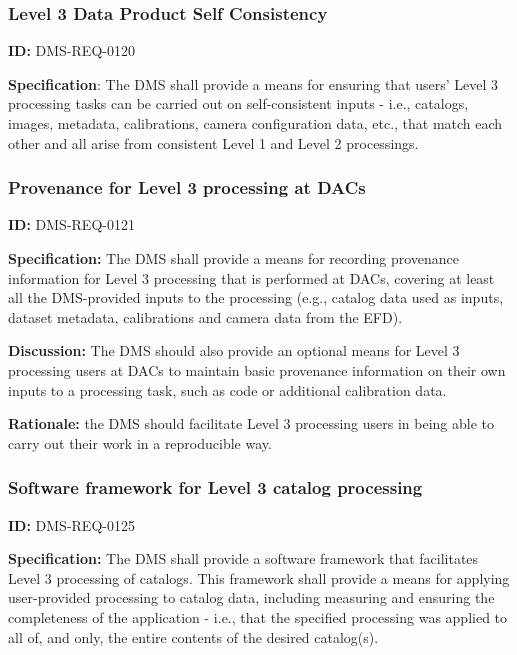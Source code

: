\documentclass[SE,toc,lsstdraft]{lsstdoc}
\begin{document}
\subsubsection{Level 3 Data Product Self Consistency}

\label{DMS-REQ-0120}
\textbf{ID:} DMS-REQ-0120

\textbf{Specification}: The DMS shall provide a means for ensuring that users' Level 3 processing tasks can be carried out on self-consistent inputs - i.e., catalogs, images, metadata, calibrations, camera configuration data, etc., that match each other and all arise from consistent Level 1 and Level 2 processings.






\subsubsection{Provenance for Level 3 processing at DACs}

\label{DMS-REQ-0121}
\textbf{ID:} DMS-REQ-0121

\textbf{Specification:} The DMS shall provide a means for recording provenance information for Level 3 processing that is performed at DACs, covering at least all the DMS-provided inputs to the processing (e.g., catalog data used as inputs, dataset metadata, calibrations and camera data from the EFD).

\textbf{Discussion:} The DMS should also provide an optional means for Level 3 processing users at DACs to maintain basic provenance information on their own inputs to a processing task, such as code or additional calibration data.

\textbf{Rationale:} the DMS should facilitate Level 3 processing users in being able to carry out their work in a reproducible way.




\subsubsection{Software framework for Level 3 catalog processing}

\label{DMS-REQ-0125}
\textbf{ID:} DMS-REQ-0125

\textbf{Specification:} The DMS shall provide a software framework that facilitates Level 3 processing of catalogs.  This framework shall provide a means for applying user-provided processing to catalog data, including measuring and ensuring the completeness of the application - i.e., that the specified processing was applied to all of, and only, the entire contents of the desired catalog(s).
\end{document}
